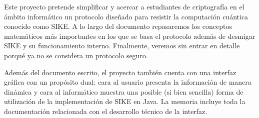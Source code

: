 
Este proyecto pretende simplificar y acercar a estudiantes de criptografía en el ámbito informático un protocolo diseñado para resistir la computación cuántica conocido como SIKE. A lo largo del documento repasaremos los conceptos matemáticos más importantes en los que se basa el protocolo además de desmigar SIKE y su funcionamiento interno. Finalmente, veremos sin entrar en detalle porqué ya no se considera un protocolo seguro.

Además del documento escrito, el proyecto también cuenta con una interfaz gráfica con un propósito dual: cara al usuario presenta la información de manera dinámica y cara al informático muestra una posible (si bien sencilla) forma de utilización de la implementación de SIKE en Java. La memoria incluye toda la documentación relacionada con el desarrollo técnico de la interfaz.